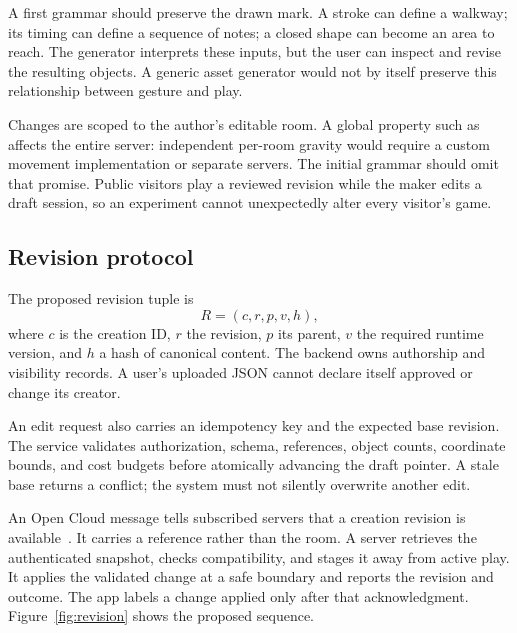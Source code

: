 \documentclass[10pt,letterpaper,twocolumn]{article}
\newcommand{\pc}[1]{{\ttfamily\small\path{#1}}}
\begin{document}
A first grammar should preserve the drawn mark. A stroke can define a walkway; its timing can define a sequence of notes; a closed shape can become an area to reach. The generator interprets these inputs, but the user can inspect and revise the resulting objects. A generic asset generator would not by itself preserve this relationship between gesture and play.

Changes are scoped to the author's editable room. A global property such as \pc{Workspace.Gravity} affects the entire server: independent per-room gravity would require a custom movement implementation or separate servers. The initial grammar should omit that promise. Public visitors play a reviewed revision while the maker edits a draft session, so an experiment cannot unexpectedly alter every visitor's game.

\subsection{Revision protocol}
The proposed revision tuple is
\[
R=(c,r,p,v,h),
\]
where $c$ is the creation ID, $r$ the revision, $p$ its parent, $v$ the required runtime version, and $h$ a hash of canonical content. The backend owns authorship and visibility records. A user's uploaded JSON cannot declare itself approved or change its creator.

An edit request also carries an idempotency key and the expected base revision. The service validates authorization, schema, references, object counts, coordinate bounds, and cost budgets before atomically advancing the draft pointer. A stale base returns a conflict; the system must not silently overwrite another edit.

An Open Cloud message tells subscribed servers that a creation revision is available~\cite{messaging}. It carries a reference rather than the room. A server retrieves the authenticated snapshot, checks compatibility, and stages it away from active play. It applies the validated change at a safe boundary and reports the revision and outcome. The app labels a change applied only after that acknowledgment. Figure~\ref{fig:revision} shows the proposed sequence.
\end{document}
